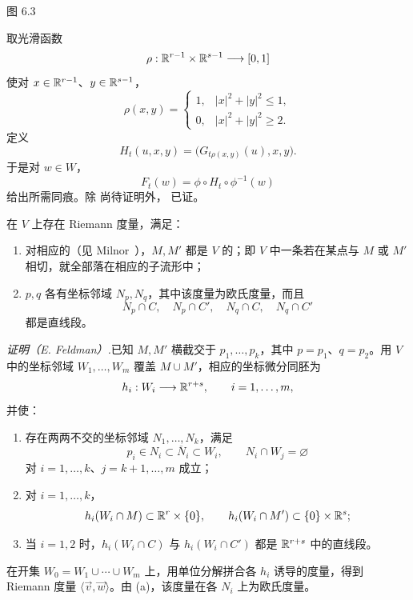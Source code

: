 \begin{center}
  \FigSixThree

  \label{fig:6.3}图 6.3
\end{center}

\label{proof:thm6-6-page74}取光滑函数
\[
  \rho:\mathbb{R}^{r-1}\times\mathbb{R}^{s-1}\longrightarrow[0,1]
\]
使对 $x\in\mathbb{R}^{r-1}$、$y\in\mathbb{R}^{s-1}$，
\[
  \rho(x,y)=
  \begin{cases}
    1,&|x|^2+|y|^2\leq1,\\
    0,&|x|^2+|y|^2\geq2.
  \end{cases}
\]
定义
\[
  H_t(u,x,y)=\bigl(G_{t\rho(x,y)}(u),x,y\bigr).
\]
于是对 $w\in W$，
\[
  F_t(w)=\phi\circ H_t\circ\phi^{-1}(w)
\]
给出所需同痕。除 尚待证明外， 已证。
\EndProof

在 $V$ 上存在 Riemann 度量，满足：
\begin{enumerate}[label=\arabic*)]
  \item 对相应的（见 Milnor~\cite[p.~44]{ref04}），$M,M'$ 都是 $V$ 的；即 $V$ 中一条若在某点与 $M$ 或 $M'$ 相切，就全部落在相应的子流形中；
  \item $p,q$ 各有坐标邻域 $N_p,N_q$，其中该度量为欧氏度量，而且
  \[
    N_p\cap C,\quad N_p\cap C',\quad
    N_q\cap C,\quad N_q\cap C'
  \]
  都是直线段。
\end{enumerate}

\par\medskip\noindent\textit{证明（E. Feldman）.}\quad 已知 $M,M'$ 横截交于 $p_1,\ldots,p_k$，其中 $p=p_1$、$q=p_2$。用 $V$ 中的坐标邻域 $W_1,\ldots,W_m$ 覆盖 $M\cup M'$，相应的坐标微分同胚为
\[
  h_i:W_i\longrightarrow\mathbb{R}^{r+s},
  \qquad i=1,\ldots,m,
\]
并使：
\begin{enumerate}[label=(\alph*)]
  \item 存在两两不交的坐标邻域 $N_1,\ldots,N_k$，满足
  \[
    p_i\in N_i\subset\overline N_i\subset W_i,
    \qquad
    N_i\cap W_j=\varnothing
  \]
  对 $i=1,\ldots,k$、$j=k+1,\ldots,m$ 成立；
  \item 对 $i=1,\ldots,k$，
  \[
    h_i(W_i\cap M)\subset\mathbb{R}^r\times\{0\},
    \qquad
    h_i(W_i\cap M')\subset\{0\}\times\mathbb{R}^s;
  \]
  \item 当 $i=1,2$ 时，$h_i(W_i\cap C)$ 与 $h_i(W_i\cap C')$ 都是 $\mathbb{R}^{r+s}$ 中的直线段。
\end{enumerate}

在开集 $W_0=W_1\cup\cdots\cup W_m$ 上，用单位分解拼合各 $h_i$ 诱导的度量，得到 Riemann 度量 $\langle\vec v,\vec w\rangle$。由 (a)，该度量在各 $N_i$ 上为欧氏度量。

